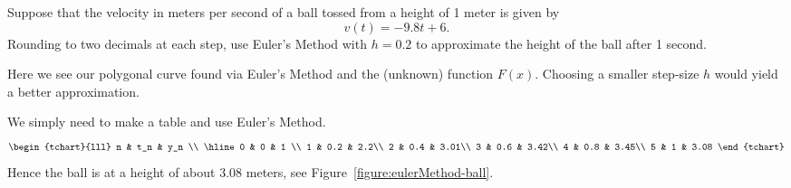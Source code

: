 \begin{example}\label{example:eulersMethodBall}
Suppose that the velocity in meters per second of a ball tossed from a
height of 1 meter is given by
\[
v(t) = -9.8t + 6.
\]
Rounding to two decimals at each step, use Euler's Method with $h=0.2$
to approximate the height of the ball after 1 second.
\end{example}
\begin{marginfigure}[0in]
\caption{Here we see our polygonal curve found via Euler's Method and
  the (unknown) function $F(x)$. Choosing a smaller step-size $h$
  would yield a better approximation.}
\label{figure:eulerMethod-ball}
\end{marginfigure}

\begin{solution}
We simply need to make a table and use Euler's Method.
\[
\begin{tchart}{lll}
n & t_n & y_n \\ \hline
0 & 0   & 1 \\
1 & 0.2 & 2.2\\
2 & 0.4 & 3.01\\
3 & 0.6 & 3.42\\
4 & 0.8 & 3.45\\
5 & 1 & 3.08
\end{tchart}
\]
Hence the ball is at a height of about $3.08$ meters, see
Figure~\ref{figure:eulerMethod-ball}.
\end{solution}



